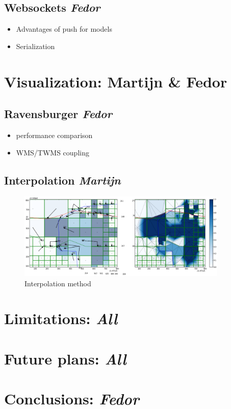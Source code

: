 \documentclass[a4paper]{article}
\begin{document}
\subsection{Websockets \emph{Fedor}}
\begin{itemize}
  \item Advantages of push for models
  \item Serialization
\end{itemize}
\section{Visualization: Martijn \& Fedor }
\subsection{Ravensburger \emph{Fedor}}
\begin{itemize}
  \item performance comparison
  \item WMS/TWMS coupling
\end{itemize}
\subsection{Interpolation \emph{Martijn}}
\begin{figure}[h]
  \centering
  \includegraphics[width=10cm]{interpolationlevees2}
  \caption{Interpolation method}
  \label{fig1}
\end{figure}
\section{Limitations: \emph{All}}

\section{Future plans: \emph{All}}

\section{Conclusions: \emph{Fedor}}






\end{document}
